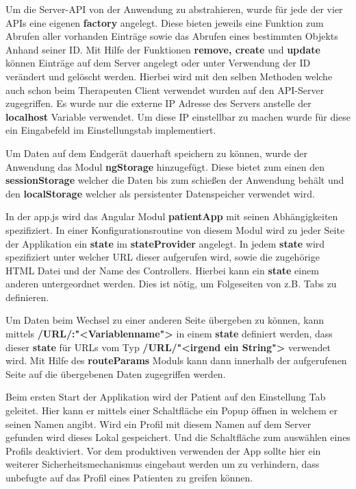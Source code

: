 Um die Server-API von der Anwendung zu abstrahieren, wurde für jede der vier APIs eine eigenen \textbf{factory} angelegt. Diese bieten jeweils eine Funktion zum Abrufen aller vorhanden Einträge sowie das Abrufen eines bestimmten Objekts Anhand seiner ID. Mit Hilfe der Funktionen \textbf{remove, create} und \textbf{update} können Einträge auf dem Server angelegt oder unter Verwendung der ID verändert und gelöscht werden. Hierbei wird mit den selben Methoden welche auch schon beim Therapeuten Client verwendet wurden auf den API-Server zugegriffen. Es wurde nur die externe IP Adresse des Servers anstelle der \textbf{localhost} Variable verwendet. Um diese IP einstellbar zu machen wurde für diese ein Eingabefeld im Einstellungstab implementiert. 

Um Daten auf dem Endgerät dauerhaft speichern zu können, wurde der Anwendung das Modul \textbf{ngStorage} hinzugefügt. Diese bietet zum einen den \textbf{sessionStorage} welcher die Daten bis zum schießen der Anwendung behält und den \textbf{localStorage} welcher als persistenter Datenspeicher verwendet wird.

In der app.js wird das Angular Modul \textbf{patientApp} mit seinen Abhängigkeiten spezifiziert. In einer Konfigurationsroutine von diesem Modul wird zu jeder Seite der Applikation ein \textbf{state} im \textbf{stateProvider} angelegt. In jedem \textbf{state} wird spezifiziert unter welcher URL dieser aufgerufen wird, sowie die zugehörige HTML Datei und der Name des Controllers. Hierbei kann ein \textbf{state} einem anderen untergeordnet werden. Dies ist nötig, um Folgeseiten von z.B. Tabs zu definieren.

Um Daten beim Wechsel zu einer anderen Seite übergeben zu können, kann mittels \textbf{/URL/:"<Variablenname">} in einem \textbf{state} definiert werden, dass dieser \textbf{state} für URLs vom Typ \textbf{/URL/"<irgend ein String">} verwendet wird. Mit Hilfe des \textbf{routeParams} Moduls kann dann innerhalb der aufgerufenen Seite auf die übergebenen Daten zugegriffen werden.

Beim ersten Start der Applikation wird der Patient auf den Einstellung Tab geleitet. Hier kann er mittels einer Schaltfläche ein Popup öffnen in welchem er seinen Namen angibt. Wird ein Profil mit diesem Namen auf dem Server gefunden wird dieses Lokal gespeichert. Und die Schaltfläche zum auswählen eines Profils deaktiviert.
Vor dem produktiven verwenden der App sollte hier ein weiterer Sicherheitsmechanismus eingebaut werden um zu verhindern, dass unbefugte auf das Profil eines Patienten zu greifen können. 

